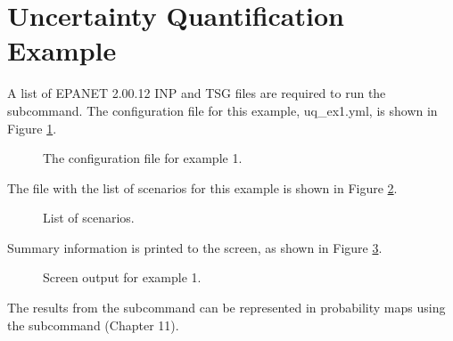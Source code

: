 \section{Uncertainty Quantification Example}

A list of EPANET 2.00.12 INP and TSG files are required to run the  subcommand. The configuration file for this example, uq\_ex1.yml, is shown in Figure \ref{fig:uq_confex1}. 

\begin{figure}[h]
  \caption{The  configuration file for example 1.}
  \label{fig:uq_confex1}
\end{figure}

The file with the list of scenarios for this example is shown in Figure \ref{fig:uq_scenarios}.

\begin{figure}[h]
  \caption{List of scenarios.}
  \label{fig:uq_scenarios}
\end{figure}

Summary information is printed to the screen, as shown in Figure \ref{fig:uq_out1}.

\begin{figure}[h]
  \caption{Screen output for example 1.}
  \label{fig:uq_out1}
\end{figure}

The results from the  subcommand can be represented in probability maps using the  subcommand (Chapter 11). 
